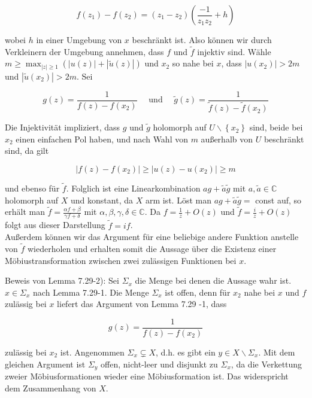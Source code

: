\documentclass[10pt, letterpaper]{article}
\begin{document}
$$
f\left(z_{1}\right)-f\left(z_{2}\right)=\left(z_{1}-z_{2}\right)\left(\frac{-1}{z_{1} z_{2}}+h\right)
$$

wobei $h$ in einer Umgebung von $x$ beschränkt ist. Also können wir durch Verkleinern der Umgebung annehmen, dass $f$ und $\widetilde{f}$ injektiv sind. Wähle $m \geqslant \max _{|z| \geqslant 1}(|u(z)|+|\widetilde{u}(z)|)$ und $x_{2}$ so nahe bei $x$, dass $\left|u\left(x_{2}\right)\right|>2 m$ und $\left|\widetilde{u}\left(x_{2}\right)\right|>2 m$. Sei

$$
g(z)=\frac{1}{f(z)-f\left(x_{2}\right)} \quad \text { und } \quad \widetilde{g}(z)=\frac{1}{\widetilde{f}(z)-\widetilde{f}\left(x_{2}\right)}
$$

Die Injektivität impliziert, dass $g$ und $\widetilde{g}$ holomorph auf $U \backslash\left\{x_{2}\right\}$ sind, beide bei $x_{2}$ einen einfachen Pol haben, und nach Wahl von $m$ außerhalb von $U$ beschränkt sind, da gilt

$$
\left|f(z)-f\left(x_{2}\right)\right| \geqslant\left|u(z)-u\left(x_{2}\right)\right| \geqslant m
$$

und ebenso für $\widetilde{f}$. Folglich ist eine Linearkombination $a g+\widetilde{a} \widetilde{g}$ mit $a, \widetilde{a} \in \mathbb{C}$ holomorph auf $X$ und konstant, da $X$ arm ist. Löst man $a g+\widetilde{a} \widetilde{g}=$ const auf, so erhält man $\widetilde{f}=\frac{\alpha f+\beta}{\gamma f+\delta}$ mit $\alpha, \beta, \gamma, \delta \in \mathbb{C}$. Da $f=\frac{1}{z}+O(z)$ und $\widetilde{f}=\frac{i}{z}+O(z)$ folgt aus dieser Darstellung $\widetilde{f}=i f$.\\
Außerdem können wir das Argument für eine beliebige andere Funktion anstelle von $\widetilde{f}$ wiederholen und erhalten somit die Aussage über die Existenz einer Möbiustransformation zwischen zwei zulässigen Funktionen bei $x$.

Beweis von Lemma 7.29-2): Sei $\Sigma_{x}$ die Menge bei denen die Aussage wahr ist. $x \in \Sigma_{x}$ nach Lemma 7.29-1. Die Menge $\Sigma_{x}$ ist offen, denn für $x_{2}$ nahe bei $x$ und $f$ zulässig bei $x$ liefert das Argument von Lemma 7.29 -1, dass

$$
g(z)=\frac{1}{f(z)-f\left(x_{2}\right)}
$$

zulässig bei $x_{2}$ ist. Angenommen $\Sigma_{x} \subsetneq X$, d.h. es gibt ein $y \in X \backslash \Sigma_{x}$. Mit dem gleichen Argument ist $\Sigma_{y}$ offen, nicht-leer und disjunkt zu $\Sigma_{x}$, da die Verkettung zweier Möbiusformationen wieder eine Möbiusformation ist. Das widerspricht dem Zusammenhang von $X$.
\end{document}
